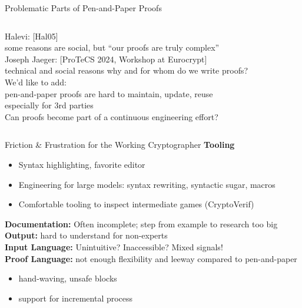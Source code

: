 \begin{frame}{Problematic Parts of Pen-and-Paper Proofs}
\begin{columns}[fullwidth,c]
\begin{column}{.68\linewidth}
      Halevi: [Hal05]\\
      \hspace{1.618em} some reasons are social, but “our proofs are truly complex”\\[1.5em]

      Joseph Jaeger: [ProTeCS 2024, Workshop at Eurocrypt]\\
      \hspace{1.618em} technical and social reasons
      \hspace{1.618em} why and for whom do we write proofs?\\[1.5em]%

      We'd like to add:\\
      \hspace{1.618em} pen-and-paper proofs are hard to maintain, update, reuse\\
      \hspace{1.618em} especially for 3rd parties\\[1.5em]%

      Can proofs become part of a continuous engineering effort?%
    \end{column}
  \end{columns}
\end{frame}





\begin{frame}{Friction \& Frustration for the Working Cryptographer}
  \hypertarget{friction-frustration}{}
  \textbf{Tooling}
  \begin{itemize}
    \item Syntax highlighting, favorite editor
    \item Engineering for large models: syntax rewriting, syntactic sugar, macros
    \item Comfortable tooling to inspect intermediate games (CryptoVerif)
  \end{itemize}
  \vspace{1em}
  \textbf{Documentation:} Often incomplete; step from example to research too big\\[.8em]

  \textbf{Output:} hard to understand for non-experts\\[.8em]

  \textbf{Input Language:} Unintuitive? Inaccessible? Mixed signals!\\[.8em]

  \textbf{Proof Language:} not enough flexibility and leeway compared to pen-and-paper
  \begin{itemize}
    \item hand-waving, unsafe blocks
    \item support for incremental process
  \end{itemize}
\end{frame}









